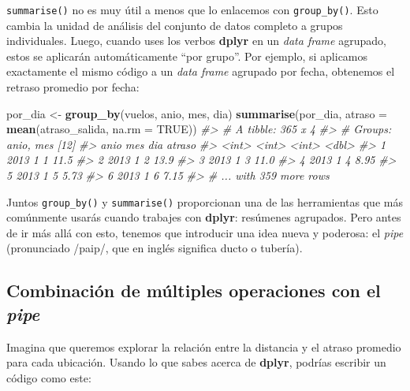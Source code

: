 \documentclass[11pt,oneside]{report}
\newenvironment{Shaded}{\begin{snugshade}}{\end{snugshade}}
\newcommand{\CommentTok}[1]{\textcolor[rgb]{0.56,0.35,0.01}{\textit{#1}}}
\newcommand{\DataTypeTok}[1]{\textcolor[rgb]{0.13,0.29,0.53}{#1}}
\newcommand{\KeywordTok}[1]{\textcolor[rgb]{0.13,0.29,0.53}{\textbf{#1}}}
\newcommand{\NormalTok}[1]{#1}
\newcommand{\OtherTok}[1]{\textcolor[rgb]{0.56,0.35,0.01}{#1}}
\newcommand{\StringTok}[1]{\textcolor[rgb]{0.31,0.60,0.02}{#1}}
\begin{document}
\texttt{summarise()} no es muy útil a menos que lo enlacemos con
\texttt{group\_by()}. Esto cambia la unidad de análisis del conjunto de
datos completo a grupos individuales. Luego, cuando uses los verbos
\textbf{dplyr} en un \emph{data frame} agrupado, estos se aplicarán
automáticamente ``por grupo''. Por ejemplo, si aplicamos exactamente el
mismo código a un \emph{data frame} agrupado por fecha, obtenemos el
retraso promedio por fecha:

\begin{Shaded}
\begin{Highlighting}[]
\NormalTok{por_dia <-}\StringTok{ }\KeywordTok{group_by}\NormalTok{(vuelos, anio, mes, dia)}
\KeywordTok{summarise}\NormalTok{(por_dia, }\DataTypeTok{atraso =} \KeywordTok{mean}\NormalTok{(atraso_salida, }\DataTypeTok{na.rm =} \OtherTok{TRUE}\NormalTok{))}
\CommentTok{#> # A tibble: 365 x 4}
\CommentTok{#> # Groups:   anio, mes [12]}
\CommentTok{#>    anio   mes   dia atraso}
\CommentTok{#>   <int> <int> <int>  <dbl>}
\CommentTok{#> 1  2013     1     1  11.5 }
\CommentTok{#> 2  2013     1     2  13.9 }
\CommentTok{#> 3  2013     1     3  11.0 }
\CommentTok{#> 4  2013     1     4   8.95}
\CommentTok{#> 5  2013     1     5   5.73}
\CommentTok{#> 6  2013     1     6   7.15}
\CommentTok{#> # ... with 359 more rows}
\end{Highlighting}
\end{Shaded}

Juntos \texttt{group\_by()} y \texttt{summarise()} proporcionan una de
las herramientas que más comúnmente usarás cuando trabajes con
\textbf{dplyr}: resúmenes agrupados. Pero antes de ir más allá con esto,
tenemos que introducir una idea nueva y poderosa: el \emph{pipe}
(pronunciado /paip/, que en inglés significa ducto o tubería).

\hypertarget{combinaciuxf3n-de-muxfaltiples-operaciones-con-el-pipe}{%
\subsection{\texorpdfstring{Combinación de múltiples operaciones con el
\emph{pipe}}{Combinación de múltiples operaciones con el pipe}}\label{combinaciuxf3n-de-muxfaltiples-operaciones-con-el-pipe}}

Imagina que queremos explorar la relación entre la distancia y el atraso
promedio para cada ubicación. Usando lo que sabes acerca de
\textbf{dplyr}, podrías escribir un código como este:
\end{document}
